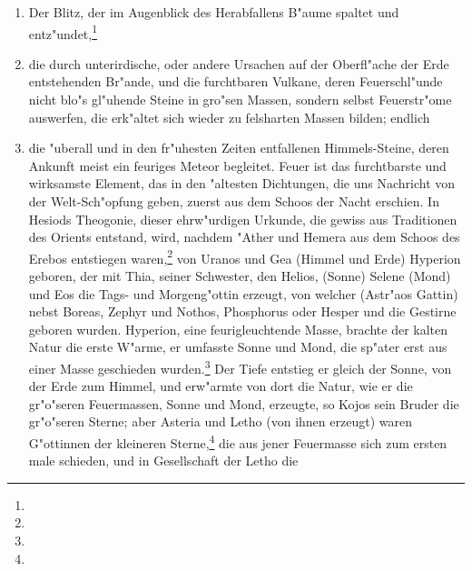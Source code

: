 \documentclass[a4paper, 11pt, oneside, polutonikogreek, german]{article}
\begin{document}
\begin{enumerate}
    \item Der Blitz, der im Augenblick des Herabfallens B"aume spaltet und entz"undet,\footnote{}
    \item die durch unterirdische, oder andere Ursachen auf der Oberfl"ache der Erde entstehenden Br"ande, und die furchtbaren Vulkane, deren Feuerschl"unde nicht blo"s gl"uhende Steine in gro"sen Massen, sondern selbst Feuerstr"ome auswerfen, die erk"altet sich wieder zu felsharten Massen bilden; endlich
    \item die "uberall und in den fr"uhesten Zeiten entfallenen Himmels-Steine, deren Ankunft meist ein feuriges Meteor begleitet. Feuer ist das furchtbarste und wirksamste Element, das in den "altesten Dichtungen, die uns Nachricht von der Welt-Sch"opfung geben, zuerst aus dem Schoos der Nacht erschien. In Hesiods Theogonie, dieser ehrw"urdigen Urkunde, die gewiss aus Traditionen des Orients entstand, wird, nachdem "Ather und Hemera aus dem Schoos des Erebos entstiegen waren,\footnote{} von Uranos und Gea (Himmel und Erde) Hyperion geboren, der mit Thia, seiner Schwester, den Helios, (Sonne) Selene (Mond) und Eos die Tags- und Morgeng"ottin erzeugt, von welcher (Astr"aos Gattin) nebst Boreas, Zephyr und Nothos, Phosphorus oder Hesper und die Gestirne geboren wurden. Hyperion, eine feurigleuchtende Masse, brachte der kalten Natur die erste W"arme, er umfasste Sonne und Mond, die sp"ater erst aus einer Masse geschieden wurden.\footnote{} Der Tiefe entstieg er gleich der Sonne, von der Erde zum Himmel, und erw"armte von dort die Natur, wie er die gr"o"seren Feuermassen, Sonne und Mond, erzeugte, so Kojos sein Bruder die gr"o"seren Sterne; aber Asteria und Letho (von ihnen erzeugt) waren G"ottinnen der kleineren Sterne,\footnote{} die aus jener Feuermasse sich zum ersten male schieden, und in Gesellschaft der Letho die 
\end{enumerate}
\end{document}
